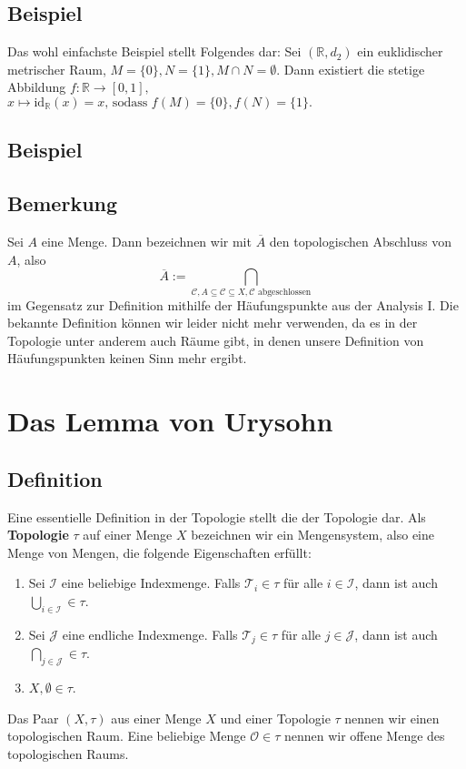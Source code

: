 \documentclass[11pt,leqno]{article}
\begin{document}
\subsection{Beispiel}
Das wohl einfachste Beispiel stellt Folgendes dar: Sei $(\mathbb{R}, d_2)$ ein euklidischer metrischer Raum, 
$M=\{0 \}, N=\{1\}, M \cap N = \emptyset. $
Dann existiert die stetige Abbildung $f: \mathbb{R} \xrightarrow{} [0,1],$ \\
$ x \mapsto \text{id}_{\mathbb{R}}(x)=x\text{, sodass } f(M)=\{0\}, f(N)= \{1\}.$

\subsection{Beispiel}

\subsection{Bemerkung}
Sei $A$ eine Menge. Dann bezeichnen wir mit $\overline{A}$ den topologischen Abschluss von $A$, also 
\[\overline{A}:= \bigcap_{\mathcal{C}, A \subseteq \mathcal{C}\subseteq X, \mathcal{C} \text{ abgeschlossen}}  \]
im Gegensatz zur Definition mithilfe der Häufungspunkte aus der Analysis I. Die bekannte Definition können wir leider nicht mehr verwenden,
da es in der Topologie unter anderem auch Räume gibt, in denen unsere Definition von Häufungspunkten keinen Sinn mehr ergibt.

\section{Das Lemma von Urysohn}

\subsection{Definition}
Eine essentielle Definition in der Topologie stellt die der Topologie dar. Als \textbf{Topologie} $\tau$ auf einer Menge $X$ bezeichnen 
wir ein Mengensystem, also eine Menge von Mengen, die folgende Eigenschaften erfüllt:
\begin{enumerate}
    \item Sei $\mathcal{I}$ eine beliebige Indexmenge. 
    Falls $\mathcal{T}_i \in \tau$ für alle $i \in \mathcal{I}$, dann ist auch $\bigcup_{i \in \mathcal{I}} \in \tau$.
    \item Sei $\mathcal{J}$ eine endliche Indexmenge.
    Falls $\mathcal{T}_j \in \tau$ für alle $j \in \mathcal{J}$, dann ist auch $\bigcap_{j \in \mathcal{J}} \in \tau$.
    \item $X, \emptyset \in \tau$.
\end{enumerate}
Das Paar $(X,\tau)$ aus einer Menge $X$ und einer Topologie $\tau$ nennen wir einen topologischen Raum. Eine beliebige Menge $\mathcal{O} \in \tau$ 
nennen wir offene Menge des topologischen Raums.
\end{document}
